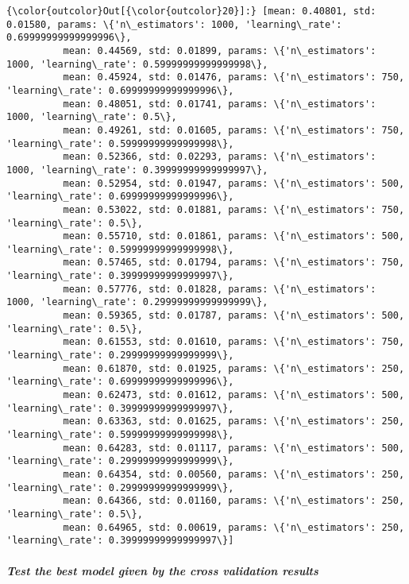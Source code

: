 \documentclass{article}
\begin{document}
            \begin{Verbatim}[commandchars=\\\{\}]
{\color{outcolor}Out[{\color{outcolor}20}]:} [mean: 0.40801, std: 0.01580, params: \{'n\_estimators': 1000, 'learning\_rate': 0.69999999999999996\},
          mean: 0.44569, std: 0.01899, params: \{'n\_estimators': 1000, 'learning\_rate': 0.59999999999999998\},
          mean: 0.45924, std: 0.01476, params: \{'n\_estimators': 750, 'learning\_rate': 0.69999999999999996\},
          mean: 0.48051, std: 0.01741, params: \{'n\_estimators': 1000, 'learning\_rate': 0.5\},
          mean: 0.49261, std: 0.01605, params: \{'n\_estimators': 750, 'learning\_rate': 0.59999999999999998\},
          mean: 0.52366, std: 0.02293, params: \{'n\_estimators': 1000, 'learning\_rate': 0.39999999999999997\},
          mean: 0.52954, std: 0.01947, params: \{'n\_estimators': 500, 'learning\_rate': 0.69999999999999996\},
          mean: 0.53022, std: 0.01881, params: \{'n\_estimators': 750, 'learning\_rate': 0.5\},
          mean: 0.55710, std: 0.01861, params: \{'n\_estimators': 500, 'learning\_rate': 0.59999999999999998\},
          mean: 0.57465, std: 0.01794, params: \{'n\_estimators': 750, 'learning\_rate': 0.39999999999999997\},
          mean: 0.57776, std: 0.01828, params: \{'n\_estimators': 1000, 'learning\_rate': 0.29999999999999999\},
          mean: 0.59365, std: 0.01787, params: \{'n\_estimators': 500, 'learning\_rate': 0.5\},
          mean: 0.61553, std: 0.01610, params: \{'n\_estimators': 750, 'learning\_rate': 0.29999999999999999\},
          mean: 0.61870, std: 0.01925, params: \{'n\_estimators': 250, 'learning\_rate': 0.69999999999999996\},
          mean: 0.62473, std: 0.01612, params: \{'n\_estimators': 500, 'learning\_rate': 0.39999999999999997\},
          mean: 0.63363, std: 0.01625, params: \{'n\_estimators': 250, 'learning\_rate': 0.59999999999999998\},
          mean: 0.64283, std: 0.01117, params: \{'n\_estimators': 500, 'learning\_rate': 0.29999999999999999\},
          mean: 0.64354, std: 0.00560, params: \{'n\_estimators': 250, 'learning\_rate': 0.29999999999999999\},
          mean: 0.64366, std: 0.01160, params: \{'n\_estimators': 250, 'learning\_rate': 0.5\},
          mean: 0.64965, std: 0.00619, params: \{'n\_estimators': 250, 'learning\_rate': 0.39999999999999997\}]
\end{Verbatim}
        
    \paragraph{\texorpdfstring{\emph{Test the best model given by the cross
validation
results}}{Test the best model given by the cross validation results}}\label{test-the-best-model-given-by-the-cross-validation-results}
\end{document}
